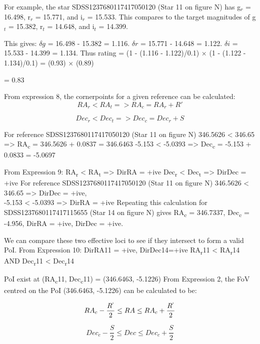 \documentclass[]{elsarticle} %
\begin{document}
For example, the star SDSS1237680117417050120 (Star 11 on figure N) has
g\(_r\) = 16.498, r\(_r\) = 15.771, and i\(_r\) = 15.533. This compares
to the target magnitudes of g\(_t\) = 15.382, r\(_t\) = 14.648, and
i\(_t\) = 14.399.

This gives: \(\delta g\) = 16.498 - 15.382 = 1.116. \(\delta r\) =
15.771 - 14.648 = 1.122. \(\delta i\) = 15.533 - 14.399 = 1.134. Thus
rating = (1 - (\textbar{}1.116 - 1.122)/0.1\textbar{}) \(\times\) (1 -
(\textbar{}1.122 - 1.134)/0.1\textbar{}) = (0.93) \(\times\) (0.89)

= 0.83

\newpage

From expression 8, the cornerpoints for a given reference can be
calculated: \[RA_r < RA_t => RA_c = RA_r + R'\]

\[Dec_r < Dec_t => Dec_c = Dec_r + S\]

For reference SDSS1237680117417050120 (Star 11 on figure N) \vskip 0.2in
346.5626 \textless{} 346.65 =\textgreater{} RA\textsubscript{c} =
346.5626 + 0.0837 = 346.6463 \vskip 0.2in -5.153 \textless{} -5.0393
=\textgreater{} Dec\textsubscript{c} = -5.153 + 0.0833 = -5.0697

From Expression 9: RA\textsubscript{r} \textless{} RA\textsubscript{t}
=\textgreater{} DirRA = +ive Dec\textsubscript{r} \textless{}
Dec\textsubscript{t} =\textgreater{} DirDec = +ive \vskip 0.2in For
reference SDSS1237680117417050120 (Star 11 on figure N) \vskip 0.2in
346.5626 \textless{} 346.65 =\textgreater{} DirDec = +ive,\\
-5.153 \textless{} -5.0393 =\textgreater{} DirRA = +ive \vskip 0.2in
Repeating this calculation for SDSS1237680117417115655 (Star 14 on
figure N) gives RA\textsubscript{c} = 346.7337, Dec\textsubscript{c} =
-4.956, \vskip 0.2in DirRA = +ive, DirDec = +ive.

We can compare these two effective loci to see if they intersect to form
a valid PoI. \vskip 0.2in From Expression 10: DirRA11 = +ive,
DirDec14=+ive RA\textsubscript{r}11 \textless{} RA\textsubscript{r}14
AND Dec\textsubscript{r}11 \textless{} Dec\textsubscript{r}14

PoI exist at (RA\textsubscript{c}11, Dec\textsubscript{c}11) =
(346.6463, -5.1226) \vskip 0.2in From Expression 2, the FoV centred on
the PoI (346.6463, -5.1226) can be calculated to be:

\[RA_c - {\frac{R^`}{2}} \leq RA \leq RA_c + {\frac{R^`}{2}} \]

\[Dec_c - {\frac{S}{2}} \leq Dec \leq Dec_c + {\frac{S}{2}}\]
\end{document}

